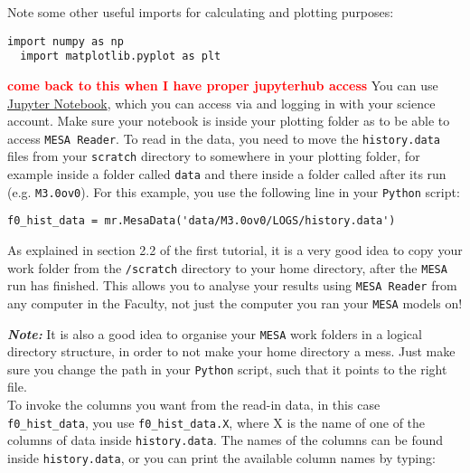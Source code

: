 \documentclass[11pt,a4paper]{article}
\newcommand{\todo}[1]{\textbf{\textcolor{red}{#1}}}
\begin{document}
\begin{enumerate}
Note some other useful imports for calculating and plotting purposes:
\begin{lstlisting}[style=pythonstyle]
  import numpy as np
  import matplotlib.pyplot as plt
\end{lstlisting}

\todo{come back to this when I have proper jupyterhub access}
You can use \href{{https://jupyterhub.science.ru.nl/}}{Jupyter Notebook}, which you can access via and logging in with your science account. 
Make sure your notebook is inside your plotting folder as to be able to access \texttt{MESA Reader}.
%
%
To read in the data, you need to move the \texttt{history.data} files from your \texttt{scratch} directory to somewhere in your plotting folder, for example inside a folder called \texttt{data} and there inside a folder called after its run (e.g. \texttt{M3.0ov0}). For this example, you use the following line in your \texttt{Python} script:

\begin{lstlisting}[style=pythonstyle]
f0_hist_data = mr.MesaData('data/M3.0ov0/LOGS/history.data')
\end{lstlisting}


\begin{tcolorbox}[protipbox]
As explained in section 2.2 of the first tutorial, it is a very good idea to copy your work folder from the \verb|/scratch| directory to your home directory, after the \texttt{MESA} run has finished. This allows you to analyse your results using \texttt{MESA Reader} from any computer in the Faculty, not just the computer you ran your \texttt{MESA} models on! 
\end{tcolorbox}


\emph{\textbf{Note:}} 
It is also a good idea to organise your \texttt{MESA} work folders in a logical directory structure, in order to not make your home directory a mess. Just make sure you change the path in your \texttt{Python} script, such that it points to the right file. \\

To invoke the columns you want from the read-in data, in this case \texttt{f0\_hist\_data}, you use \texttt{f0\_hist\_data.X}, where X is the name of one of the columns of data inside \texttt{history.data}. The names of the columns can be found inside \texttt{history.data}, or you can print the available column names by typing: 


\end{enumerate}
\end{document}
